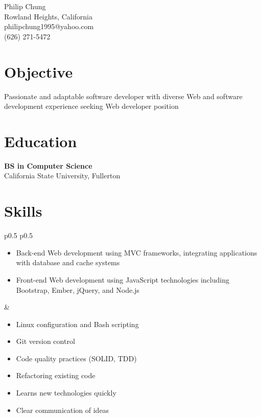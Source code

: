 \documentclass[10pt]{article}
\newcommand{\baseheader}[3]{#1 \marginpar{\raggedleft #2} \\ #3}
\begin{document}
	\begin{center}
		{\LARGE Philip Chung} \\
		Rowland Heights, California \\
		philipchung1995@yahoo.com \\
		(626) 271-5472 \\
	\end{center}

	\section*{Objective}

	Passionate and adaptable software developer with diverse Web and software development experience seeking Web developer position

	\section*{Education}

	\baseheader{\textbf{BS in Computer Science}}{1/2018}{California State University, Fullerton}

	\section*{Skills}

	\begin{tabular}{p{0.5\textwidth} p{0.5\textwidth}}
		\begin{minipage}[t]{\linewidth}
			\raggedright
			\begin{itemize}[nosep]
				\item Back-end Web development using MVC frameworks, integrating applications with database and cache systems
				\item Front-end Web development using JavaScript technologies including Bootstrap, Ember, jQuery, and Node.js
			\end{itemize}
		\end{minipage}
		&
		\begin{minipage}[t]{\linewidth}
			\raggedright
			\begin{itemize}[nosep]
				\item Linux configuration and Bash scripting
				\item Git version control
				\item Code quality practices (SOLID, TDD)
				\item Refactoring existing code
				\item Learns new technologies quickly
				\item Clear communication of ideas
			\end{itemize}
		\end{minipage}
	\end{tabular}
\end{document}
